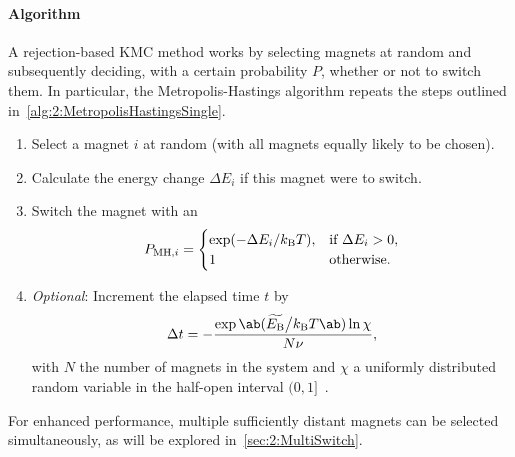 \paragraph{Algorithm}
A rejection-based KMC method works by selecting magnets at random and subsequently deciding, with a certain probability $P$, whether or not to switch them.
In particular, the Metropolis-Hastings algorithm repeats the steps outlined in~\cref{alg:2:MetropolisHastingsSingle}.
\begin{algorithm}
	\label{alg:2:MetropolisHastingsSingle}
	\begin{enumerate}
		\item Select a magnet $i$ at random (with all magnets equally likely to be chosen).
		\item Calculate the energy change $\Delta E_i$ if this magnet were to switch.
		\item Switch the magnet with an 
		\begin{equation}
			\label{eq:2:MH_acceptance}
			P_{\mathrm{MH},i} = \begin{cases}
				\exp(-\Delta E_i/\kBT), & \text{if } \Delta E_i > 0 \mathrm{,} \\
				1 & \text{otherwise} \mathrm{.}
			\end{cases}
		\end{equation}
		\item \textit{Optional}:
		Increment the elapsed time $t$ by
		\begin{equation}
			\Delta t = -\frac{\exp\ab(\EBeff\big/\kBT\ab) \ln{\chi}}{N \nu} \mathrm{,}
			\label{eq:Metropolis_time}
		\end{equation}
		with $N$ the number of magnets in the system and $\chi$ a uniformly distributed random variable in the half-open interval $(0,1]$~\cite{PhysicalTimeKMC}. %
	\end{enumerate}
\end{algorithm}
For enhanced performance, multiple sufficiently distant magnets can be selected simultaneously, as will be explored in~\cref{sec:2:MultiSwitch}.

